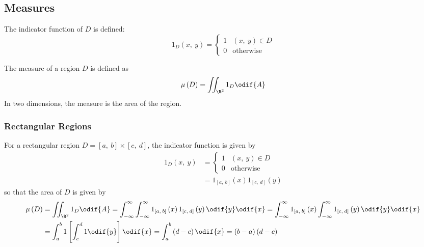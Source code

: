 \documentclass{article}
\begin{document}
\subsection{Measures}
\begin{definition}
    The indicator function of \(D\) is defined:
    \begin{equation*}
        1_D\left( x,\: y \right) =
        \begin{cases}
            1 & \left( x,\: y \right) \in D \\
            0 & \text{otherwise}
        \end{cases}
    \end{equation*}
\end{definition}
\begin{definition}[Measure]
    The measure of a region \(D\) is defined as
    \begin{equation*}
        \mu\left( D \right) = \iint_{\R^2} 1_D \odif{A}
    \end{equation*}
    In two dimensions, the measure is the area of the region.
\end{definition}
\subsubsection{Rectangular Regions}
For a rectangular region \(D = \left[ a,\: b \right] \times \left[ c,\:
d \right]\), the indicator function is given by
\begin{align*}
    1_D\left( x,\: y \right) & =
    \begin{cases}
        1 & \left( x,\: y \right) \in D \\
        0 & \text{otherwise}
    \end{cases}
    \\
                             & = 1_{\left[ a,\: b \right]} \left( x \right) 1_{\left[ c,\: d \right]} \left( y \right)
\end{align*}
so that the area of \(D\) is given by
\begin{align*}
    \mu\left( D \right) & = \iint_{\R^2} 1_D \odif{A} = \int_{-\infty}^\infty \int_{-\infty}^\infty 1_{\left[ a,\: b \right]} \left( x \right) 1_{\left[ c,\: d \right]} \left( y \right) \odif{y} \odif{x} = \int_{-\infty}^\infty 1_{\left[ a,\: b \right]} \left( x \right) \int_{-\infty}^\infty 1_{\left[ c,\: d \right]} \left( y \right) \odif{y} \odif{x} \\
                        & = \int_a^b 1 \left[ \int_c^d 1 \odif{y} \right] \odif{x} = \int_a^b \left( d - c \right) \odif{x} = \left( b - a \right) \left( d - c \right)
\end{align*}
\end{document}
